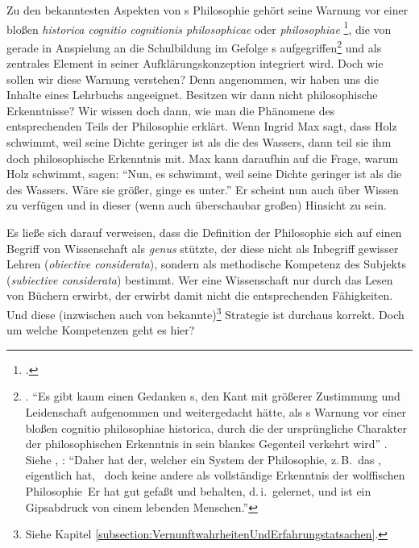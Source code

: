 Zu den bekanntesten Aspekten von s
Philosophie gehört seine Warnung vor einer bloßen \emph{historica
cognitio cognitionis
philosophicae} oder \emph{philosophiae}
\footnote{\cite[Vgl.][\S\S~9,
51]{Wolff:Discursuspraeliminarisdephilosophiaingenere1996}.}, die von
 gerade in Anspielung an die Schulbildung im Gefolge
s
aufgegriffen\footnote{\cite[Vgl.][61--3]{Hinske:ZwischenAufklaerungundVernunftkritik1993}.
\enquote{Es gibt kaum einen Gedanken s, den Kant mit größerer Zustimmung
und Leidenschaft aufgenommen und weitergedacht hätte, als s Warnung vor
einer bloßen cognitio philosophiae historica, durch die der ursprüngliche
Charakter der philosophischen Erkenntnis in sein blankes Gegenteil verkehrt
wird} \parencite[][62]{Hinske:ZwischenAufklaerungundVernunftkritik1993}.
Siehe \cite[][B~864]{Kant:KritikderreinenVernunft2003}, \cite[][III:
540.37--541.12]{Kant:GesammelteWerke1900ff.}: \enquote{Daher hat der, welcher
ein System der Philosophie, z.\,B.\ das , eigentlich
 hat, \punkt\ doch keine andere als vollständige 
Erkenntnis der wolffischen Philosophie\punkt\ Er hat gut gefaßt und behalten,
d.\,i.\ gelernet, und ist ein Gipsabdruck von einem lebenden Menschen.}} und als
zentrales Element in seiner Aufklärungskonzeption integriert
wird. Doch wie sollen wir diese Warnung verstehen?
Denn angenommen, wir haben uns die Inhalte eines Lehrbuchs angeeignet. Besitzen
wir dann nicht philosophische Erkenntnisse? Wir wissen doch dann, wie man die
Phänomene des entsprechenden Teils der Philosophie erklärt. Wenn Ingrid Max
sagt, dass Holz schwimmt, weil seine Dichte geringer ist als die des Wassers,
dann teil sie ihm doch philosophische Erkenntnis mit. Max kann daraufhin auf die
Frage, warum Holz schwimmt, sagen: \enquote{Nun, es schwimmt, weil seine Dichte
geringer ist als die des Wassers. Wäre sie größer, ginge es unter.} Er scheint
nun auch über  Wissen zu verfügen und in dieser (wenn auch
überschaubar großen) Hinsicht  zu sein.

Es ließe sich darauf verweisen, dass die Definition der Philosophie sich auf
einen Begriff von Wissenschaft als \emph{genus} stützte, der diese nicht als
Inbegriff gewisser Lehren (\emph{obiective considerata}), sondern als
methodische Kompetenz des Subjekts (\emph{subiective considerata}) bestimmt. Wer
eine Wissenschaft nur durch das Lesen von Büchern erwirbt, der erwirbt damit
nicht die entsprechenden Fähigkeiten. Und diese (inzwischen auch von
 bekannte)\footnote{Siehe Kapitel
\ref{subsection:VernunftwahrheitenUndErfahrungstatsachen}.} Strategie ist durchaus korrekt.
Doch um welche Kompetenzen geht es hier?


